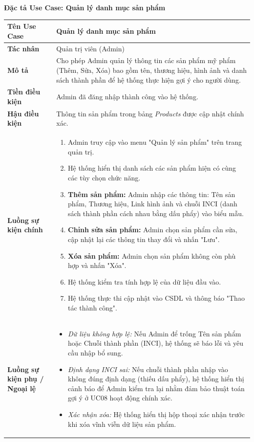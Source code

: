 \documentclass[12pt,a4paper]{article}
\begin{document}


\vspace{0.5cm}





\vspace{0.5cm}
\textbf{Đặc tả Use Case: Quản lý danh mục sản phẩm}

\begin{center}
\renewcommand{\arraystretch}{1.4}
\begin{tabular}{|p{4cm}|p{10cm}|}
\hline
\rowcolor{blue!15}
\textbf{Tên Use Case} & \textbf{Quản lý danh mục sản phẩm} \\ \hline
\textbf{Tác nhân} & Quản trị viên (Admin) \\ \hline
\textbf{Mô tả} & Cho phép Admin quản lý thông tin các sản phẩm mỹ phẩm (Thêm, Sửa, Xóa) bao gồm tên, thương hiệu, hình ảnh và danh sách thành phần để hệ thống thực hiện gợi ý cho người dùng. \\ \hline
\textbf{Tiền điều kiện} & Admin đã đăng nhập thành công vào hệ thống. \\ \hline
\textbf{Hậu điều kiện} & Thông tin sản phẩm trong bảng \textit{Products} được cập nhật chính xác. \\ \hline
\textbf{Luồng sự kiện chính} & 
\begin{enumerate}
    \item Admin truy cập vào menu "Quản lý sản phẩm" trên trang quản trị.
    \item Hệ thống hiển thị danh sách các sản phẩm hiện có cùng các tùy chọn chức năng.
    \item \textbf{Thêm sản phẩm:} Admin nhập các thông tin: Tên sản phẩm, Thương hiệu, Link hình ảnh và chuỗi INCI (danh sách thành phần cách nhau bằng dấu phẩy) vào biểu mẫu.
    \item \textbf{Chỉnh sửa sản phẩm:} Admin chọn sản phẩm cần sửa, cập nhật lại các thông tin thay đổi và nhấn "Lưu".
    \item \textbf{Xóa sản phẩm:} Admin chọn sản phẩm không còn phù hợp và nhấn "Xóa".
    \item Hệ thống kiểm tra tính hợp lệ của dữ liệu đầu vào.
    \item Hệ thống thực thi cập nhật vào CSDL và thông báo "Thao tác thành công".
\end{enumerate} \\ \hline
\textbf{Luồng sự kiện phụ / Ngoại lệ} & 
\begin{itemize}
    \item \textit{Dữ liệu không hợp lệ:} Nếu Admin để trống Tên sản phẩm hoặc Chuỗi thành phần (INCI), hệ thống sẽ báo lỗi và yêu cầu nhập bổ sung.
    \item \textit{Định dạng INCI sai:} Nếu chuỗi thành phần nhập vào không đúng định dạng (thiếu dấu phẩy), hệ thống hiển thị cảnh báo để Admin kiểm tra lại nhằm đảm bảo thuật toán gợi ý ở UC08 hoạt động chính xác.
    \item \textit{Xác nhận xóa:} Hệ thống hiển thị hộp thoại xác nhận trước khi xóa vĩnh viễn dữ liệu sản phẩm.
\end{itemize} \\ \hline
\end{tabular}
\end{center}
\end{document}
